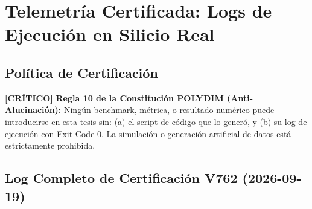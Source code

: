 \chapter{Telemetría Certificada: Logs de Ejecución en Silicio Real}


\section*{Política de Certificación}

\textbf{[CRÍTICO]} 
\textbf{Regla 10 de la Constitución POLYDIM (Anti-Alucinación):}
Ningún benchmark, métrica, o resultado numérico puede introducirse en esta tesis sin:
(a) el script de código que lo generó, y
(b) su log de ejecución con Exit Code 0.
La simulación o generación artificial de datos está estrictamente prohibida.


\section{Log Completo de Certificación V762 (2026-09-19)}

